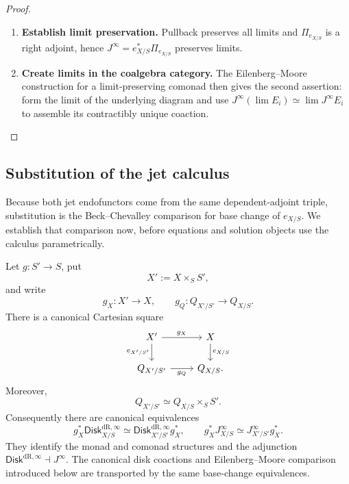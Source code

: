 \begin{proof}
\leavevmode
\begin{enumerate}[label=\textup{(\arabic*)}]
    \item \textbf{Establish limit preservation.}
Pullback preserves all limits and \(\Pi_{e_{X/S}}\) is a right adjoint, hence
\(J^\infty=e_{X/S}^*\Pi_{e_{X/S}}\) preserves limits.

    \item \textbf{Create limits in the coalgebra category.}
The Eilenberg--Moore construction for a limit-preserving comonad
\cite{LurieHigherAlgebra} then gives the second assertion: form the limit of the underlying diagram and use
\(J^\infty(\lim E_i)\simeq\lim J^\infty E_i\) to assemble its contractibly unique coaction.
\end{enumerate}
\end{proof}

\subsection{Substitution of the jet calculus}
\label{sec:jet-base-change}

Because both jet endofunctors come from the same dependent-adjoint triple,
substitution is the Beck--Chevalley comparison for base change of \(e_{X/S}\). We establish that comparison now,
before equations and solution objects use the calculus parametrically.

\begin{theorem}
\label{thm:jet-base-change}
Let \(g:S'\to S\), put
\[
  X':=X\times_SS',
\]
and write
\[
  g_X:X'\to X,
  \qquad
  g_Q:Q_{X'/S'}\to Q_{X/S}.
\]
There is a canonical Cartesian square
\[
\begin{tikzcd}
X' \ar[r,"g_X"] \ar[d,"e_{X'/S'}"']
  & X \ar[d,"e_{X/S}"]\\
Q_{X'/S'} \ar[r,"g_Q"']
  & Q_{X/S}.
\end{tikzcd}
\]
Moreover,
\[
  Q_{X'/S'}\simeq Q_{X/S}\times_SS'.
\]
Consequently there are canonical equivalences
\[
  g_X^*\mathsf{Disk}^{\mathrm{dR},\infty}_{X/S}
  \simeq
  \mathsf{Disk}^{\mathrm{dR},\infty}_{X'/S'}g_X^*,
  \qquad
  g_X^*J^\infty_{X/S}
  \simeq
  J^\infty_{X'/S'}g_X^*.
\]
They identify the monad and comonad structures and the adjunction
\(\mathsf{Disk}^{\mathrm{dR},\infty}\dashv J^\infty\). The canonical disk coactions and Eilenberg--Moore comparison introduced below
are transported by the same base-change equivalences.
\end{theorem}

